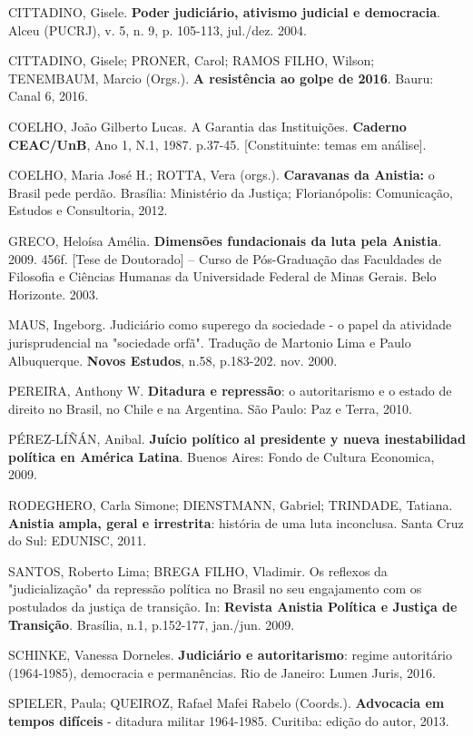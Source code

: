 CITTADINO, Gisele. \textbf{Poder judiciário, ativismo judicial e
democracia}. Alceu (PUCRJ), v. 5, n. 9, p. 105-113, jul./dez. 2004.

CITTADINO, Gisele; PRONER, Carol; RAMOS FILHO, Wilson; TENEMBAUM, Marcio
(Orgs.). \textbf{A resistência ao golpe de 2016}. Bauru: Canal 6, 2016.

COELHO, João Gilberto Lucas. A Garantia das Instituições.
\textbf{Caderno CEAC/UnB}, Ano 1, N.1, 1987. p.37-45. {[}Constituinte:
temas em análise{]}.

COELHO, Maria José H.; ROTTA, Vera (orgs.). \textbf{Caravanas da
Anistia:} o Brasil pede perdão. Brasília: Ministério da Justiça;
Florianópolis: Comunicação, Estudos e Consultoria, 2012.

GRECO, Heloísa Amélia. \textbf{Dimensões fundacionais da luta pela
Anistia}. 2009. 456f. {[}Tese de Doutorado{]} -- Curso de Pós-Graduação
das Faculdades de Filosofia e Ciências Humanas da Universidade Federal
de Minas Gerais. Belo Horizonte. 2003.

MAUS, Ingeborg. Judiciário como superego da sociedade - o papel da
atividade jurisprudencial na "sociedade orfã". Tradução de Martonio Lima
e Paulo Albuquerque. \textbf{Novos Estudos}, n.58, p.183-202. nov. 2000.

PEREIRA, Anthony W. \textbf{Ditadura e repressão}: o autoritarismo e o
estado de direito no Brasil, no Chile e na Argentina. São Paulo: Paz e
Terra, 2010.

PÉREZ-LÍÑÁN, Anibal. \textbf{Juício político al presidente y nueva
inestabilidad política en América Latina}. Buenos Aires: Fondo de
Cultura Economica, 2009.

RODEGHERO, Carla Simone; DIENSTMANN, Gabriel; TRINDADE, Tatiana.
\textbf{Anistia ampla, geral e irrestrita}: história de uma luta
inconclusa. Santa Cruz do Sul: EDUNISC, 2011.

SANTOS, Roberto Lima; BREGA FILHO, Vladimir. Os reflexos da
"judicialização" da repressão política no Brasil no seu engajamento com
os postulados da justiça de transição. In: \textbf{Revista Anistia
Política e Justiça de Transição}. Brasília, n.1, p.152-177, jan./jun.
2009.

SCHINKE, Vanessa Dorneles. \textbf{Judiciário e autoritarismo}: regime
autoritário (1964-1985), democracia e permanências. Rio de Janeiro:
Lumen Juris, 2016.

SPIELER, Paula; QUEIROZ, Rafael Mafei Rabelo (Coords.).
\textbf{Advocacia em tempos difíceis} - ditadura militar 1964-1985.
Curitiba: edição do autor, 2013.


